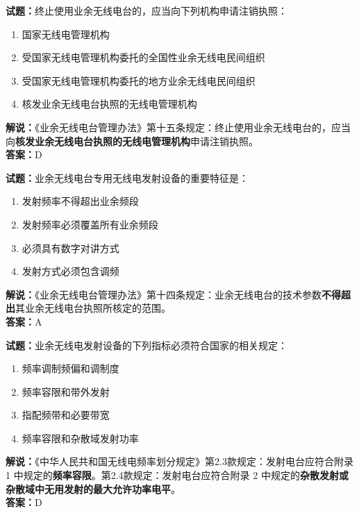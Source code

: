 \documentclass{ctexbook}
\begin{document}
\vspace{1em}

\textbf{试题：}终止使用业余无线电台的，应当向下列机构申请注销执照：
\begin{enumerate}[leftmargin=3em]
  \item 国家无线电管理机构
  \item 受国家无线电管理机构委托的全国性业余无线电民间组织
  \item 受国家无线电管理机构委托的地方业余无线电民间组织
  \item 核发业余无线电台执照的无线电管理机构
\end{enumerate}
\noindent\textbf{解说：}《业余无线电台管理办法》第十五条规定：终止使用业余无线电台的，应当向\textbf{核发业余无线电台执照的无线电管理机构}申请注销执照。\\\noindent\textbf{答案：}D

\vspace{1em}

\textbf{试题：}业余无线电台专用无线电发射设备的重要特征是：
\begin{enumerate}[leftmargin=3em]
  \item 发射频率不得超出业余频段
  \item 发射频率必须覆盖所有业余频段
  \item 必须具有数字对讲方式
  \item 发射方式必须包含调频
\end{enumerate}
\noindent\textbf{解说：}《业余无线电台管理办法》第十四条规定：业余无线电台的技术参数\textbf{不得超出}其业余无线电台执照所核定的范围。\\\noindent\textbf{答案：}A


\vspace{1em}

\textbf{试题：}业余无线电发射设备的下列指标必须符合国家的相关规定：
\begin{enumerate}[leftmargin=3em]
  \item 频率调制频偏和调制度
  \item 频率容限和带外发射
  \item 指配频带和必要带宽
  \item 频率容限和杂散域发射功率
\end{enumerate}
\noindent\textbf{解说：}《中华人民共和国无线电频率划分规定》第2.3款规定：发射电台应符合附录 1 中规定的\textbf{频率容限}。第2.4款规定：发射电台应符合附录 2 中规定的\textbf{杂散发射或杂散域中无用发射的最大允许功率电平}。\\\noindent\textbf{答案：}D
\end{document}

